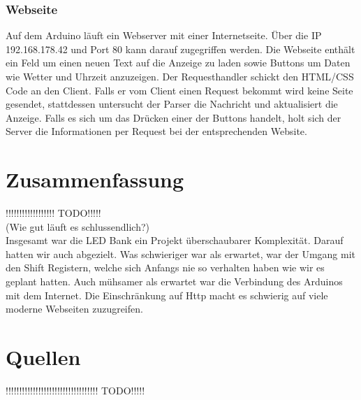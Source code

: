 \documentclass[10pt,a4paper]{article}
\begin{document}
\subsubsection{Webseite}

Auf dem Arduino läuft ein Webserver mit einer Internetseite. Über die IP 192.168.178.42 und Port 80 kann darauf zugegriffen werden. Die Webseite enthält ein Feld um einen neuen Text auf die Anzeige zu laden sowie Buttons um Daten wie Wetter und Uhrzeit anzuzeigen. Der Requesthandler schickt den HTML/CSS Code an den Client. Falls er vom Client einen Request bekommt wird keine Seite gesendet, stattdessen untersucht der Parser die Nachricht und aktualisiert die Anzeige. Falls es sich um das Drücken einer der Buttons handelt, holt sich der Server die Informationen per Request bei der entsprechenden Website. \\

\section{Zusammenfassung}

!!!!!!!!!!!!!!!!!! TODO!!!!!\\
(Wie gut läuft es schlussendlich?)\\

Insgesamt war die LED Bank ein Projekt überschaubarer Komplexität. Darauf hatten wir auch abgezielt. Was schwieriger war als erwartet, war der Umgang mit den Shift Registern, welche sich Anfangs nie so verhalten haben wie wir es geplant hatten. Auch mühsamer als erwartet war die Verbindung des Arduinos mit dem Internet. Die Einschränkung auf Http macht es schwierig auf viele moderne Webseiten zuzugreifen.\\

\section{Quellen}

!!!!!!!!!!!!!!!!!!!!!!!!!!!!!!!!!! TODO!!!!!\\
\end{document}
